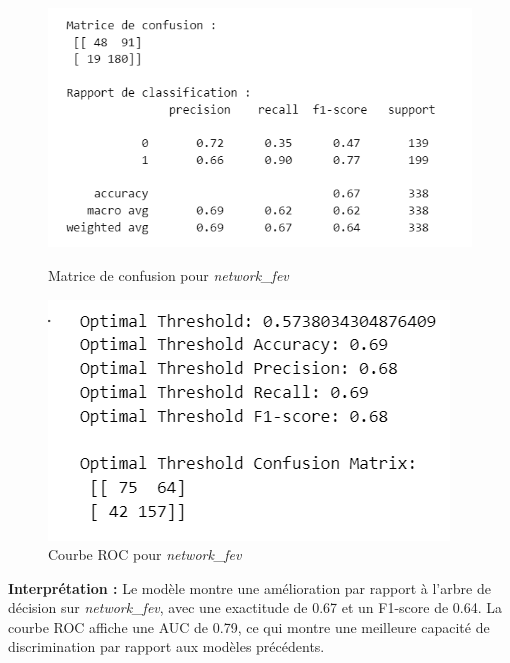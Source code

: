 \begin{figure}[H]
    \centering
    \begin{minipage}{0.45\linewidth}
        \centering
        \includegraphics[width=\linewidth]{capture_modele_9.png}
        \caption{Matrice de confusion pour \textit{network\_fev}}
    \end{minipage}
    \hfill
    \begin{minipage}{0.45\linewidth}
        \centering
        \includegraphics[width=\linewidth]{capture_modele_10.png}
        \caption{Courbe ROC pour \textit{network\_fev}}
    \end{minipage}
\end{figure}

\textbf{Interprétation :} Le modèle montre une amélioration par rapport à l'arbre de décision sur \textit{network\_fev}, avec une exactitude de 0.67 et un F1-score de 0.64. La courbe ROC affiche une AUC de 0.79, ce qui montre une meilleure capacité de discrimination par rapport aux modèles précédents.

